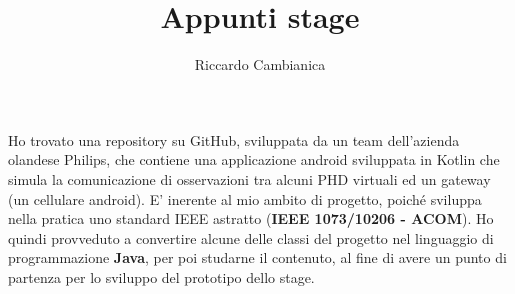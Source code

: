 \documentclass[a4paper]{article}
\title{Appunti stage}
\author{Riccardo Cambianica}
\begin{document}
    \maketitle
    Ho trovato una repository su GitHub, sviluppata da un team dell'azienda olandese Philips,
    che contiene una applicazione android sviluppata in Kotlin che simula la comunicazione di osservazioni tra
    alcuni PHD virtuali ed un gateway (un cellulare android).
    E' inerente al mio ambito di progetto, poiché sviluppa nella pratica uno standard IEEE 
    astratto (\textbf{IEEE 1073/10206 - ACOM}).
    Ho quindi provveduto a convertire alcune delle classi del progetto nel linguaggio di programmazione
    \textbf{Java}, per poi studarne il contenuto, al fine di avere un punto di partenza per lo sviluppo del prototipo
    dello stage.    
\end{document}
